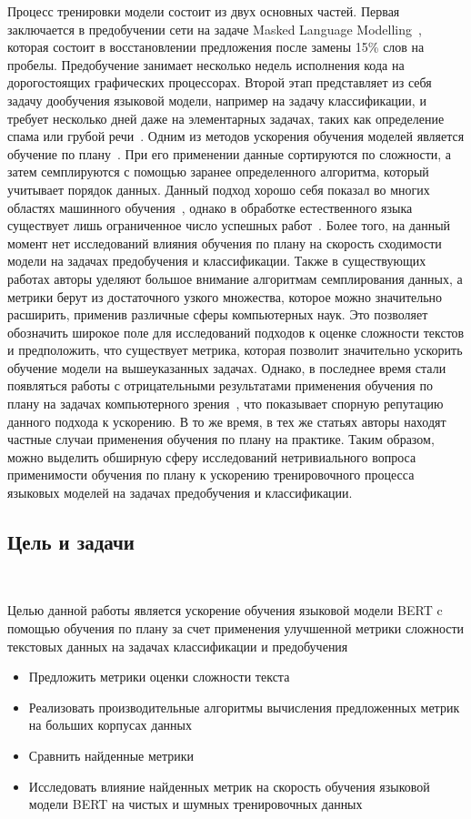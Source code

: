 \documentclass{spbau-diploma}
\begin{document}
Процесс тренировки модели состоит из двух основных частей. Первая заключается в предобучении сети на задаче Masked Language Modelling~\cite{devlin2018bert}, которая состоит в восстановлении предложения после замены 15\% слов на пробелы. Предобучение занимает несколько недель исполнения кода на дорогостоящих графических процессорах. Второй этап представляет из себя задачу дообучения языковой модели, например на задачу классификации, и требует несколько дней даже на элементарных задачах, таких как определение спама или грубой речи~\cite{gertner2019mitre}. Одним из методов ускорения обучения моделей является обучение по плану~\cite{bengio2009curriculum}. При его применении данные сортируются по сложности, а затем семплируются с помощью заранее определенного алгоритма, который учитывает порядок данных. Данный подход хорошо себя показал во многих областях машинного обучения~\cite{narvekar2020curriculum, hacohen2019power, mermer2017scalable}, однако в обработке естественного языка существует лишь ограниченное число успешных работ~\cite{platanios2019competence, xu2020curriculum}. Более того, на данный момент нет исследований влияния обучения по плану на скорость сходимости модели на задачах предобучения и классификации. Также в существующих работах авторы уделяют большое внимание алгоритмам семплирования данных, а метрики берут из достаточного узкого множества, которое можно значительно расширить, применив различные сферы компьютерных наук. Это позволяет обозначить широкое поле для исследований подходов к оценке сложности текстов и предположить, что существует метрика, которая позволит значительно ускорить обучение модели на вышеуказанных задачах. Однако, в последнее время стали появляться работы с отрицательными результатами применения обучения по плану на задачах компьютерного зрения~\cite{wu2020curricula}, что показывает спорную репутацию данного подхода к ускорению. В то же время, в тех же статьях авторы находят частные случаи применения обучения по плану на практике. Таким образом, можно выделить обширную сферу исследований нетривиального вопроса применимости обучения по плану к ускорению тренировочного процесса языковых моделей на задачах предобучения и классификации.

\subsection*{Цель и задачи}
\ 

Целью данной работы является ускорение обучения языковой модели BERT c помощью обучения по плану за счет применения улучшенной метрики сложности текстовых данных на задачах классификации и предобучения
\begin{itemize}
	\item Предложить метрики оценки сложности текста
	\item Реализовать производительные алгоритмы вычисления предложенных метрик на больших корпусах данных
	\item Сравнить найденные метрики
	\item Исследовать влияние найденных метрик на скорость обучения языковой модели BERT на чистых и шумных тренировочных данных
\end{itemize}
\end{document}
